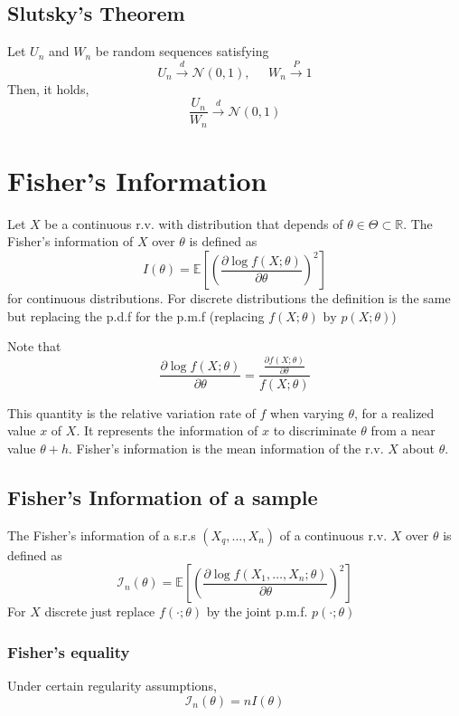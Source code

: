 \subsection{Slutsky's Theorem}
Let $U_n$ and $W_n$ be random sequences satisfying
\[ U_n\xrightarrow{d}\mathcal{N}(0,1),\;\;\;\;\; W_n\xrightarrow{P}1\] Then, it
holds,
\[\frac{U_n}{W_n} \xrightarrow{d} \mathcal{N}(0,1)\]

\section{Fisher's Information}
Let $X$ be a continuous r.v. with distribution that depends of $\theta \in
\Theta \subset \mathbb{R}$. The Fisher's information of $X$ over $\theta$ is
defined as
\[ I(\theta) = \mathbb{E}\left[\left(\frac{\partial\log
f(X;\theta)}{\partial\theta}\right)^2\right] \] for continuous distributions.
For discrete distributions the definition is the same but replacing the p.d.f
for the p.m.f (replacing $f(X;\theta) \text{ by } p(X;\theta)$)
\begin{tcolorbox}
    Note that
    \[ \frac{\partial\log f(X;\theta)}{\partial\theta} = \frac{\frac{\partial
    f(X;\theta)}{\partial\theta}}{f(X;\theta)} \]
\end{tcolorbox}

This quantity is the relative variation rate of $f$ when varying $\theta$, for a
realized value $x$ of $X$. It represents the information of $x$ to discriminate
$\theta$ from a near value $\theta+h$. Fisher’s information is the mean
information of the r.v. $X$ about $\theta$.

\subsection{Fisher's Information of a sample}
The Fisher's information of a s.r.s $(X_q,\dots,X_n)$ of a continuous r.v. $X$
over $\theta$ is defined as
\[ \mathcal{I}_n(\theta) = \mathbb{E}\left[\left(\frac{\partial\log
f(X_1,\dots,X_n;\theta)}{\partial\theta}\right)^2\right] \] For $X$ discrete
just replace $f(\cdot;\theta)$ by the joint p.m.f. $p(\cdot;\theta)$

\subsubsection{Fisher's equality}
Under certain regularity assumptions,
\[ \mathcal{I}_n(\theta) = nI(\theta) \]

